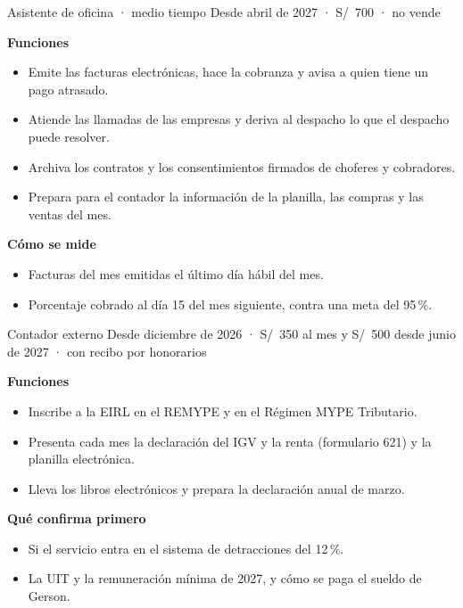 \documentclass[10.5pt,a4paper]{article}
\begin{document}
\begin{rol}{Asistente de oficina · medio tiempo}
{\small\color{tenue}Desde abril de 2027 · S/~700 · no vende}\par\vspace{3pt}
\begin{minipage}[t]{0.52\linewidth}\small\textbf{\color{marca}Funciones}
\begin{itemize}
\item Emite las facturas electrónicas, hace la cobranza y avisa a quien tiene un pago atrasado.
\item Atiende las llamadas de las empresas y deriva al despacho lo que el despacho puede resolver.
\item Archiva los contratos y los consentimientos firmados de choferes y cobradores.
\item Prepara para el contador la información de la planilla, las compras y las ventas del mes.
\end{itemize}\end{minipage}\hfill
\begin{minipage}[t]{0.44\linewidth}\small\textbf{\color{marca}Cómo se mide}
\begin{itemize}
\item Facturas del mes emitidas el último día hábil del mes.
\item Porcentaje cobrado al día 15 del mes siguiente, contra una meta del 95\,\%.
\end{itemize}\end{minipage}
\end{rol}

\begin{rol}{Contador externo}
{\small\color{tenue}Desde diciembre de 2026 · S/~350 al mes y S/~500 desde junio de 2027 · con recibo por honorarios}\par\vspace{3pt}
\begin{minipage}[t]{0.52\linewidth}\small\textbf{\color{marca}Funciones}
\begin{itemize}
\item Inscribe a la EIRL en el REMYPE y en el Régimen MYPE Tributario.
\item Presenta cada mes la declaración del IGV y la renta (formulario 621) y la planilla electrónica.
\item Lleva los libros electrónicos y prepara la declaración anual de marzo.
\end{itemize}\end{minipage}\hfill
\begin{minipage}[t]{0.44\linewidth}\small\textbf{\color{marca}Qué confirma primero}
\begin{itemize}
\item Si el servicio entra en el sistema de detracciones del 12\,\%.
\item La UIT y la remuneración mínima de 2027, y cómo se paga el sueldo de Gerson.
\end{itemize}\end{minipage}
\end{rol}
\end{document}

